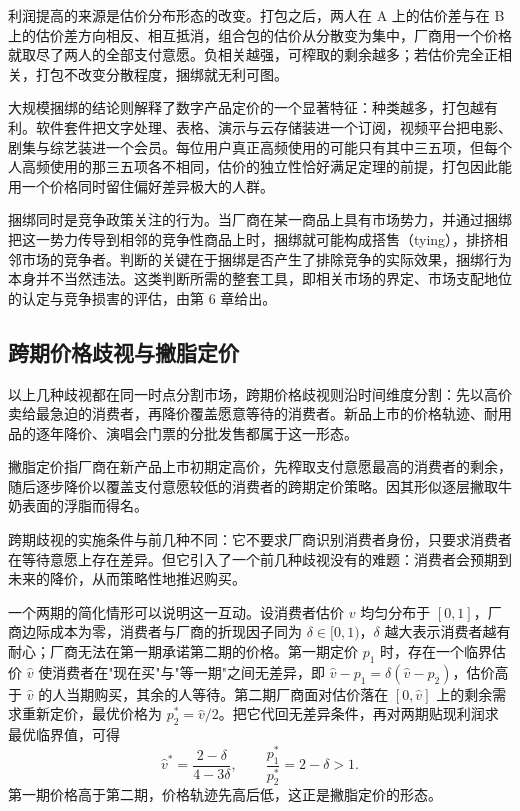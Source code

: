 利润提高的来源是估价分布形态的改变。打包之后，两人在 A 上的估价差与在 B 上的估价差方向相反、相互抵消，组合包的估价从分散变为集中，厂商用一个价格就取尽了两人的全部支付意愿。负相关越强，可榨取的剩余越多；若估价完全正相关，打包不改变分散程度，捆绑就无利可图。

大规模捆绑的结论则解释了数字产品定价的一个显著特征：种类越多，打包越有利。软件套件把文字处理、表格、演示与云存储装进一个订阅，视频平台把电影、剧集与综艺装进一个会员。每位用户真正高频使用的可能只有其中三五项，但每个人高频使用的那三五项各不相同，估价的独立性恰好满足定理的前提，打包因此能用一个价格同时留住偏好差异极大的人群。

捆绑同时是竞争政策关注的行为。当厂商在某一商品上具有市场势力，并通过捆绑把这一势力传导到相邻的竞争性商品上时，捆绑就可能构成搭售（tying），排挤相邻市场的竞争者。判断的关键在于捆绑是否产生了排除竞争的实际效果，捆绑行为本身并不当然违法。这类判断所需的整套工具，即相关市场的界定、市场支配地位的认定与竞争损害的评估，由第 6 章给出。

\subsection{跨期价格歧视与撇脂定价}

以上几种歧视都在同一时点分割市场，跨期价格歧视则沿时间维度分割：先以高价卖给最急迫的消费者，再降价覆盖愿意等待的消费者。新品上市的价格轨迹、耐用品的逐年降价、演唱会门票的分批发售都属于这一形态。

\begin{definition}
撇脂定价指厂商在新产品上市初期定高价，先榨取支付意愿最高的消费者的剩余，随后逐步降价以覆盖支付意愿较低的消费者的跨期定价策略。因其形似逐层撇取牛奶表面的浮脂而得名。
\end{definition}

跨期歧视的实施条件与前几种不同：它不要求厂商识别消费者身份，只要求消费者在等待意愿上存在差异。但它引入了一个前几种歧视没有的难题：消费者会预期到未来的降价，从而策略性地推迟购买。

一个两期的简化情形可以说明这一互动。设消费者估价 $v$ 均匀分布于 $[0,1]$，厂商边际成本为零，消费者与厂商的折现因子同为 $\delta \in [0,1)$，$\delta$ 越大表示消费者越有耐心；厂商无法在第一期承诺第二期的价格。第一期定价 $p_1$ 时，存在一个临界估价 $\hat v$ 使消费者在"现在买"与"等一期"之间无差异，即 $\hat v - p_1 = \delta(\hat v - p_2)$，估价高于 $\hat v$ 的人当期购买，其余的人等待。第二期厂商面对估价落在 $[0,\hat v]$ 上的剩余需求重新定价，最优价格为 $p_2^* = \hat v/2$。把它代回无差异条件，再对两期贴现利润求最优临界值，可得
\[
\hat v^* = \frac{2-\delta}{4-3\delta}, \qquad \frac{p_1^*}{p_2^*} = 2 - \delta > 1 .
\]
第一期价格高于第二期，价格轨迹先高后低，这正是撇脂定价的形态。

